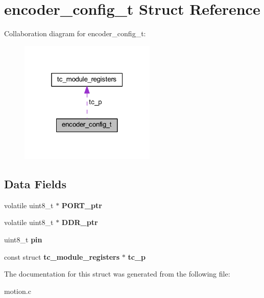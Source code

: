 \section{encoder\+\_\+config\+\_\+t Struct Reference}
\label{structencoder__config__t}


Collaboration diagram for encoder\+\_\+config\+\_\+t\+:\nopagebreak
\begin{figure}[H]
\begin{center}
\leavevmode
\includegraphics[width=184pt]{structencoder__config__t__coll__graph}
\end{center}
\end{figure}
\subsection*{Data Fields}
\begin{DoxyCompactItemize}
\item 
volatile uint8\+\_\+t $\ast$ {\bfseries P\+O\+R\+T\+\_\+ptr}\label{structencoder__config__t_a9cb2f16ba9ae962a2f4f401f4e53ae72}

\item 
volatile uint8\+\_\+t $\ast$ {\bfseries D\+D\+R\+\_\+ptr}\label{structencoder__config__t_a5dc1a4776f66ab5e5eacce4ccbb048b2}

\item 
uint8\+\_\+t {\bfseries pin}\label{structencoder__config__t_ad48157b503f3847e3b08bc3e204a0d47}

\item 
const struct {\bf tc\+\_\+module\+\_\+registers} $\ast$ {\bfseries tc\+\_\+p}\label{structencoder__config__t_a63ef61b522de661084aca5407037622d}

\end{DoxyCompactItemize}


The documentation for this struct was generated from the following file\+:\begin{DoxyCompactItemize}
\item 
motion.\+c\end{DoxyCompactItemize}
